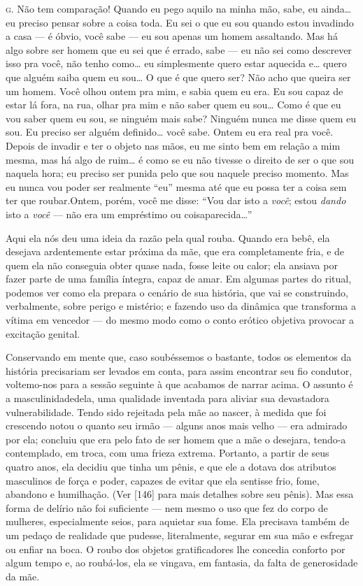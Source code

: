 \noindent\hskip0mm\textsc{g.} Não tem comparação! Quando eu pego aquilo na minha mão, sabe, eu
ainda\ldots{} eu preciso pensar sobre a coisa toda. Eu sei o que eu sou
quando estou invadindo a casa --- é óbvio, você sabe --- eu sou
apenas um homem assaltando. Mas há algo sobre ser homem que eu sei que
é errado, sabe --- eu não sei como descrever isso pra você, não tenho
como\ldots{} eu simplesmente quero estar aquecida e\ldots{} quero que alguém
saiba quem eu sou\ldots{} O que é que quero ser? Não acho que queira ser um
homem. Você olhou ontem pra mim, e sabia quem eu era. Eu sou capaz de
estar lá fora, na rua, olhar pra mim e não saber quem eu sou\ldots{} Como é
que eu vou saber quem eu sou, se ninguém mais sabe? Ninguém nunca me
disse quem eu sou. Eu preciso ser alguém definido\ldots{} você sabe. Ontem
eu era real pra você. Depois de invadir e ter o objeto nas mãos, eu me
sinto bem em relação a mim mesma, mas há algo de ruim\ldots{} é como se eu
não tivesse o direito de ser o que sou naquela hora; eu preciso ser
punida pelo que sou naquele preciso momento. Mas eu nunca vou poder ser
realmente ``eu'' mesma até que eu possa ter a
coisa sem ter que roubar.\idxiden[|)] Ontem, porém, você me disse:
``Vou dar isto a \textit{você}; estou \textit{dando} isto
a \textit{você} --- não era um empréstimo ou coisa\idxidenhis[|)]
parecida\ldots{}''


\bigskip

Aqui ela nós deu uma ideia da razão pela qual rouba. Quando era
bebê, ela desejava ardentemente estar próxima da mãe, que era
completamente fria, e de quem ela não conseguia obter quase nada, fosse
leite ou calor; ela ansiava por fazer parte de uma família íntegra,
capaz de amar. Em algumas partes do ritual, podemos ver como ela
prepara o cenário de sua história, que vai se construindo, verbalmente,
sobre perigo e mistério; e fazendo uso da dinâmica que transforma a
vítima em vencedor --- do mesmo modo como o conto erótico objetiva
provocar a excitação genital.

Conservando em mente que, caso soubéssemos o bastante, todos os
elementos da história precisariam ser levados em conta, para assim
encontrar seu fio condutor, voltemo-nos para a sessão seguinte à que
acabamos de narrar acima. O assunto é a masculinidade\idxmasc[|(] dela, uma
qualidade inventada para aliviar sua devastadora vulnerabilidade. Tendo
sido rejeitada pela mãe ao nascer, à medida que foi crescendo notou o
quanto seu irmão --- alguns anos mais velho --- era admirado por
ela; concluiu que era pelo fato de ser homem que a mãe o desejara,
tendo-a contemplado, em troca, com uma frieza extrema. Portanto, a
partir de seus quatro anos, ela decidiu que tinha um pênis,\idxpenisimag{} e que ele a
dotava dos atributos masculinos de força e poder, capazes de evitar
que ela sentisse frio, fome, abandono e humilhação. (Ver [146] para
mais detalhes sobre seu pênis). Mas essa forma de delírio não foi
suficiente --- nem mesmo o uso que fez do corpo de mulheres,
especialmente seios,\idxseios{} para aquietar sua fome. Ela precisava também de um
pedaço de realidade que pudesse, literalmente, segurar em sua mão e
esfregar ou enfiar na boca. O roubo dos objetos gratificadores lhe
concedia conforto por algum tempo e, ao roubá-los, ela se vingava, em
fantasia, da falta de generosidade da mãe.

